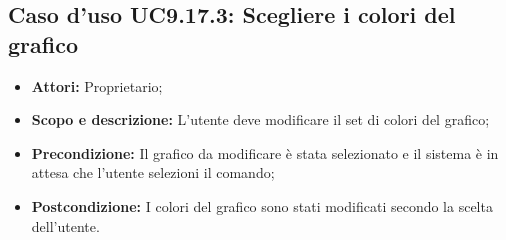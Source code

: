 \subsection{Caso d'uso UC9.17.3: Scegliere i colori del grafico}
\begin{itemize}
	\item \textbf{Attori:} Proprietario;
	\item \textbf{Scopo e descrizione:} L'utente deve modificare il set di colori del grafico;
	\item \textbf{Precondizione:} Il grafico da modificare è stata selezionato e il sistema è in attesa che l'utente selezioni il comando;
	\item \textbf{Postcondizione:} I colori del grafico sono stati modificati secondo la scelta dell'utente.
\end{itemize}